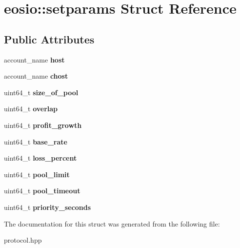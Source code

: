 \hypertarget{structeosio_1_1setparams}{}\section{eosio\+:\+:setparams Struct Reference}
\label{structeosio_1_1setparams}
\subsection*{Public Attributes}
\begin{DoxyCompactItemize}
\item 
\mbox{\label{structeosio_1_1setparams_a5463e702f979751659eabda1be34b7bb}} 
account\+\_\+name {\bfseries host}
\item 
\mbox{\label{structeosio_1_1setparams_a94f7fcc1682e65652e652c2c29bf08dd}} 
account\+\_\+name {\bfseries chost}
\item 
\mbox{\label{structeosio_1_1setparams_a098fddcd3d82214479b5df535fe96618}} 
uint64\+\_\+t {\bfseries size\+\_\+of\+\_\+pool}
\item 
\mbox{\label{structeosio_1_1setparams_a2d7dfca06942d6e8fcfaedebdeada8a5}} 
uint64\+\_\+t {\bfseries overlap}
\item 
\mbox{\label{structeosio_1_1setparams_a09872261c34d9155df1210fa5104f9c3}} 
uint64\+\_\+t {\bfseries profit\+\_\+growth}
\item 
\mbox{\label{structeosio_1_1setparams_a2032558dbb663b75ddc1298dbc00dcab}} 
uint64\+\_\+t {\bfseries base\+\_\+rate}
\item 
\mbox{\label{structeosio_1_1setparams_afc0922d99c9c5b2a0fbd3a307bd56b84}} 
uint64\+\_\+t {\bfseries loss\+\_\+percent}
\item 
\mbox{\label{structeosio_1_1setparams_a5bc2f11b4d6aa1aedfa3933de310377d}} 
uint64\+\_\+t {\bfseries pool\+\_\+limit}
\item 
\mbox{\label{structeosio_1_1setparams_a2e81b2a803d43aa1ea1270807e791d25}} 
uint64\+\_\+t {\bfseries pool\+\_\+timeout}
\item 
\mbox{\label{structeosio_1_1setparams_adada48199d0ec6ca07122a92cfbe6f48}} 
uint64\+\_\+t {\bfseries priority\+\_\+seconds}
\end{DoxyCompactItemize}


The documentation for this struct was generated from the following file\+:\begin{DoxyCompactItemize}
\item 
protocol.\+hpp\end{DoxyCompactItemize}
